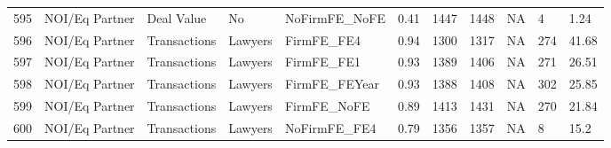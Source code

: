 \documentclass{article}
\begin{document}
\begin{table}[H]
\begin{tabular}{rllllllllll}
  595 & NOI/Eq Partner & Deal Value & No & NoFirmFE\_NoFE & 0.41 & 1447 & 1448 & NA & 4 & 1.24 \\ 
  596 & NOI/Eq Partner & Transactions & Lawyers & FirmFE\_FE4 & 0.94 & 1300 & 1317 & NA & 274 & 41.68 \\ 
  597 & NOI/Eq Partner & Transactions & Lawyers & FirmFE\_FE1 & 0.93 & 1389 & 1406 & NA & 271 & 26.51 \\ 
  598 & NOI/Eq Partner & Transactions & Lawyers & FirmFE\_FEYear & 0.93 & 1388 & 1408 & NA & 302 & 25.85 \\ 
  599 & NOI/Eq Partner & Transactions & Lawyers & FirmFE\_NoFE & 0.89 & 1413 & 1431 & NA & 270 & 21.84 \\ 
  600 & NOI/Eq Partner & Transactions & Lawyers & NoFirmFE\_FE4 & 0.79 & 1356 & 1357 & NA & 8 & 15.2 \\ 
   \hline
\end{tabular}
\end{table}
\end{document}
